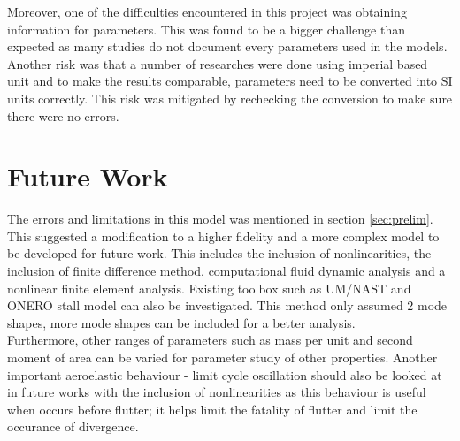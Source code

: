 \documentclass[11pt]{article}
\begin{document}
Moreover, one of the difficulties encountered in this project was obtaining information for parameters. This was found to be a bigger challenge than expected as many studies do not document every parameters used in the models. Another risk was that a number of researches were done using imperial based unit and to make the results comparable, parameters need to be converted into SI units correctly. This risk was mitigated by rechecking the conversion to make sure there were no errors.

\section{Future Work}
\label{sec:future-work}

The errors and limitations in this model was mentioned in section \ref{sec:prelim}. This suggested a modification to a higher fidelity and a more complex model to be developed for future work. This includes the inclusion of nonlinearities, the inclusion of finite difference method, computational fluid dynamic analysis and a nonlinear finite element analysis. Existing toolbox such as UM/NAST and ONERO stall model can also be investigated. This method only assumed 2 mode shapes, more mode shapes can be included for a better analysis.\\

Furthermore, other ranges of parameters such as mass per unit and second moment of area can be varied for parameter study of other properties. Another important aeroelastic behaviour - limit cycle oscillation should also be looked at in future works with the inclusion of nonlinearities as this behaviour is useful when occurs before flutter; it helps limit the fatality of flutter and limit the occurance of divergence.
\end{document}
